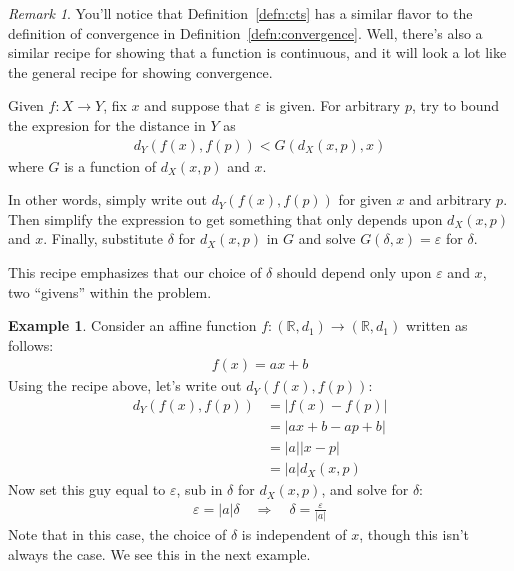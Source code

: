 \documentclass[12pt]{article}
\numberwithin{equation}{section} %
\theoremstyle{plain}
\theoremstyle{definition}
\newtheorem{ex}[thm]{Example}
\theoremstyle{remark}
\newtheorem*{rmk}{Remark}
\newcommand{\R}{\mathbb{R}}
\begin{document}
\begin{rmk}
You'll notice that Definition~\ref{defn:cts} has a similar flavor to the
definition of convergence in Definition~\ref{defn:convergence}. Well,
there's also a similar recipe for showing that a function is continuous,
and it will look a lot like the general recipe for showing convergence.

Given $f:X\rightarrow Y$, fix $x$ and suppose that $\varepsilon$ is
given. For arbitrary $p$, try to bound the expresion for the distance in
$Y$ as
\begin{align*}
  d_Y(f(x), f(p)) < G\left(d_X(x,p), x\right)
\end{align*}
where $G$ is a function of $d_X(x,p)$ and $x$.

In other words, simply write out $d_Y(f(x),f(p))$ for given $x$ and
arbitrary $p$.  Then simplify the expression to get something that only
depends upon $d_X(x,p)$ and $x$. Finally, substitute $\delta$ for
$d_X(x,p)$ in $G$ and solve $G(\delta,x)=\varepsilon$ for $\delta$.

This recipe emphasizes that our choice of $\delta$ should depend only
upon $\varepsilon$ and $x$, two ``givens'' within the problem.
\end{rmk}

\begin{ex}
Consider an affine function $f:(\R,d_1) \rightarrow
(\R,d_1)$ written as follows:
\begin{align*}
  f(x) = ax + b
\end{align*}
Using the recipe above, let's write out $d_Y(f(x),f(p))$:
\begin{align*}
  d_Y(f(x),f(p))
  &= |f(x)-f(p)|\\
  &= |ax+b-ap+b|\\
  &= |a||x-p|\\
  &= |a|d_X(x,p)
\end{align*}
Now set this guy equal to $\varepsilon$, sub in $\delta$ for $d_X(x,p)$,
and solve for $\delta$:
\begin{align*}
  \varepsilon = |a| \delta
  \quad \Rightarrow\quad
  \delta = \frac{\varepsilon}{|a|}
\end{align*}
Note that in this case, the choice of $\delta$ is independent of $x$,
though this isn't always the case. We see this in the next example.
\end{ex}
\end{document}
